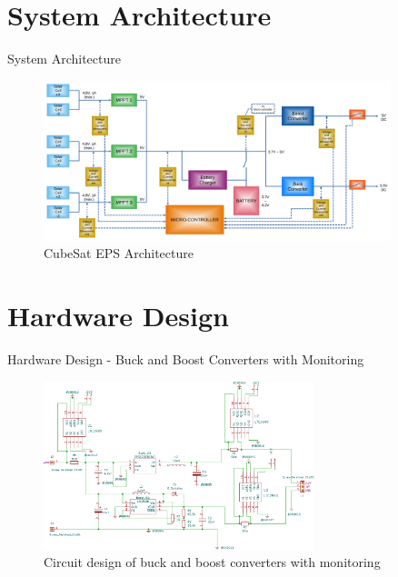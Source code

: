 \documentclass[aspectratio=169]{beamer}
\begin{document}
		
		
		\section{System Architecture}
		\begin{frame}{System Architecture}
			\begin{figure}[h]
				\centering
				\includegraphics[width=0.9\textwidth]{diag1.pdf}
				\caption{CubeSat EPS Architecture}
				\label{fig:mesh1}
			\end{figure}
			
			
		\end{frame}
		
		\section{Hardware Design}
		\begin{frame}{Hardware Design - Buck and Boost Converters with Monitoring }
			\begin{figure}[h]
				\centering
				\includegraphics[width=0.7\textwidth]{diag/1.pdf}
				\caption{Circuit design of buck and boost converters with monitoring}
				\label{fig:bubo}
			\end{figure}
		\end{frame}
		
\end{document}
